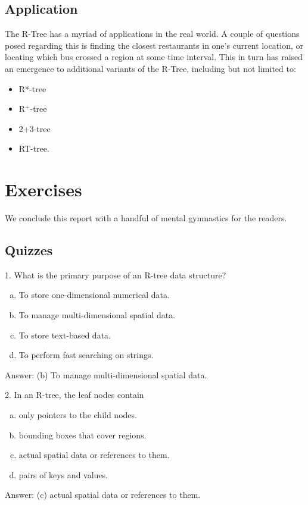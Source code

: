 \documentclass{article}
\begin{document}
\subsection{Application}
The R-Tree has a myriad of applications in the real world. A couple of questions posed regarding this is finding the closest restaurants in one's current location, or locating which bus crossed a region at some time interval. This in turn has raised an emergence to additional variants of the R-Tree, including but not limited to:
\begin{itemize}
	\item R*-tree
	\item R$^+$-tree
	\item 2+3-tree
	\item RT-tree.
\end{itemize}

\section{Exercises}
We conclude this report with a handful of mental gymnastics for the readers.
\subsection{Quizzes}
\begin{question}{1. What is the primary purpose of an R-tree data structure?}
	\begin{enumerate}[(a)]
		\item To store one-dimensional numerical data.
		\item To manage multi-dimensional spatial data.
		\item To store text-based data.
		\item To perform fast searching on strings.
	\end{enumerate}
\end{question}
Answer: (b) To manage multi-dimensional spatial data.

\begin{question}{2. In an R-tree, the leaf nodes contain}
	\begin{enumerate}[(a)]
		\item only pointers to the child nodes.
		\item bounding boxes that cover regions.
		\item actual spatial data or references to them.
		\item pairs of keys and values.
	\end{enumerate}
\end{question}
Answer: (c) actual spatial data or references to them.
\end{document}
